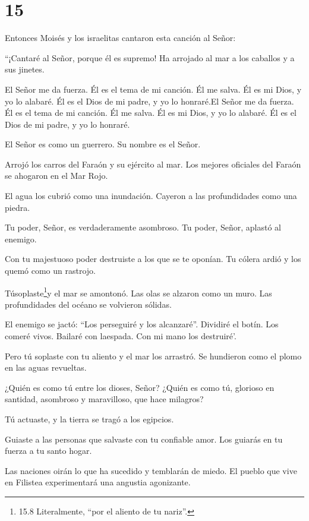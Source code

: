 \hypertarget{section-14}{%
\section{15}\label{section-14}}

 Entonces Moisés y los israelitas cantaron esta canción al
Señor:

``¡Cantaré al Señor, porque él es supremo! Ha arrojado al mar a los
caballos y a sus jinetes.

 El Señor me da fuerza. Él es el tema de mi canción. Él me
salva. Él es mi Dios, y yo lo alabaré. Él es el Dios de mi padre, y yo
lo honraré.El Señor me da fuerza. Él es el tema de mi canción. Él me
salva. Él es mi Dios, y yo lo alabaré. Él es el Dios de mi padre, y yo
lo honraré.

 El Señor es como un guerrero. Su nombre es el Señor.

 Arrojó los carros del Faraón y su ejército al mar. Los
mejores oficiales del Faraón se ahogaron en el Mar Rojo.

 El agua los cubrió como una inundación. Cayeron a las
profundidades como una piedra.

 Tu poder, Señor, es verdaderamente asombroso. Tu poder,
Señor, aplastó al enemigo.

 Con tu majestuoso poder destruiste a los que se te oponían.
Tu cólera ardió y los quemó como un rastrojo.

 Túsoplaste\footnote{15.8 Literalmente, ``por el aliento de
  tu nariz''.}y el mar se amontonó. Las olas se alzaron como un muro.
Las profundidades del océano se volvieron sólidas.

 El enemigo se jactó: ``Los perseguiré y los alcanzaré''.
Dividiré el botín. Los comeré vivos. Bailaré con laespada. Con mi mano
los destruiré'.

 Pero tú soplaste con tu aliento y el mar los arrastró. Se
hundieron como el plomo en las aguas revueltas.

 ¿Quién es como tú entre los dioses, Señor? ¿Quién es como
tú, glorioso en santidad, asombroso y maravilloso, que hace milagros?

 Tú actuaste, y la tierra se tragó a los egipcios.

 Guiaste a las personas que salvaste con tu confiable amor.
Los guiarás en tu fuerza a tu santo hogar.

 Las naciones oirán lo que ha sucedido y temblarán de
miedo. El pueblo que vive en Filistea experimentará una angustia
agonizante.

